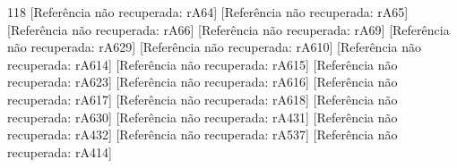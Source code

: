 \begin{thebibliography}{118}
 [Referência não recuperada: rA64]
 [Referência não recuperada: rA65]
 [Referência não recuperada: rA66]
 [Referência não recuperada: rA69]
 [Referência não recuperada: rA629]
 [Referência não recuperada: rA610]
 [Referência não recuperada: rA614]
 [Referência não recuperada: rA615]
 [Referência não recuperada: rA623]
 [Referência não recuperada: rA616]
 [Referência não recuperada: rA617]
 [Referência não recuperada: rA618]
 [Referência não recuperada: rA630]
 [Referência não recuperada: rA431]
 [Referência não recuperada: rA432]
 [Referência não recuperada: rA537]
 [Referência não recuperada: rA414]

\end{thebibliography}
